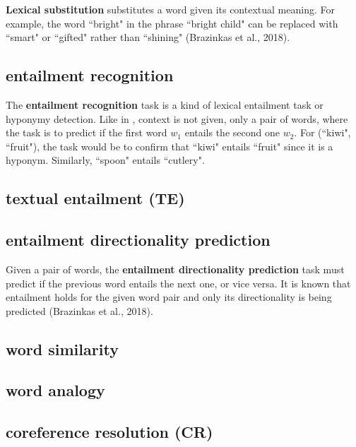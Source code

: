 \textbf{Lexical substitution} substitutes a word given its contextual meaning. For example, the word ``bright" in the phrase ``bright child" can be replaced with ``smart" or ``gifted" rather than ``shining" (Brazinkas et al., 2018). 

\subsection{entailment recognition} \label{nlptask:entailmentrecognition}

The \textbf{entailment recognition} task is a kind of lexical entailment task or hyponymy detection. Like in , context is not given, only a pair of words, where the task is to predict if the first word $w_1$ entails the second one $w_2$. For (``kiwi", ``fruit"), the task would be to confirm that ``kiwi" entails ``fruit" since it is a hyponym. Similarly, ``spoon" entails ``cutlery". 


\subsection{textual entailment (TE)} \label{nlptask:textualentailmentTE}

\subsection{entailment directionality prediction} \label{nlptask:entailmentdirectionalityprediction}

Given a pair of words, the \textbf{entailment directionality prediction} task must predict if the previous word entails the next one, or vice versa. It is known that entailment holds for the given word pair and only its directionality is being predicted (Brazinkas et al., 2018). 


\subsection{word similarity} \label{nlptask:wordsimilarity}

\subsection{word analogy} \label{nlptask:wordanalogy}

\subsection{coreference resolution (CR)} \label{nlptask:coreferenceresolutionCR}

